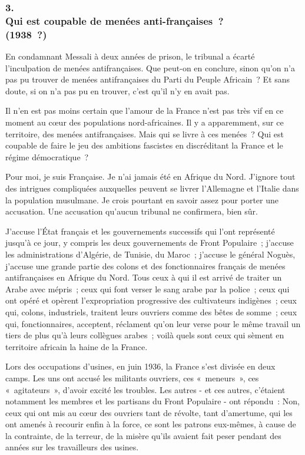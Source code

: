 \documentclass[french,twoside]{book} %
\begin{document}
\subsubsection[{3. Qui est coupable de menées anti-françaises ? (1938 ?)}]{3. \\
Qui est coupable de menées anti-françaises ? \\
(1938 ?)}
\noindent \par
En condamnant Messali à deux années de prison, le tribunal a écarté l'inculpation de menées antifrançaises. Que peut-on en conclure, sinon qu'on n'a pas pu trouver de menées antifrançaises du Parti du Peuple Africain ? Et sans doute, si on n'a pas pu en trouver, c'est qu'il n'y en avait pas.\par
Il n'en est pas moins certain que l'amour de la France n'est pas très vif en ce moment au cœur des populations nord-africaines. Il y a apparemment, sur ce territoire, des menées antifrançaises. Mais qui se livre à ces menées ? Qui est coupable de faire le jeu des ambitions fascistes en discréditant la France et le régime démocratique ?\par
Pour moi, je suis Française. Je n'ai jamais été en Afrique du Nord. J'ignore tout des intrigues compliquées auxquelles peuvent se livrer l'Allemagne et l'Italie dans la population musulmane. Je crois pourtant en savoir assez pour porter une accusation. Une accusation qu'aucun tribunal ne confirmera, bien sûr.\par
J'accuse l'État français et les gouvernements successifs qui l'ont représenté jusqu'à ce jour, y compris les deux gouvernements de Front Populaire ; j'accuse les administrations d'Algérie, de Tunisie, du Maroc ; j'accuse le général Noguès, j'accuse une grande partie des colons et des fonctionnaires français de menées antifrançaises en Afrique du Nord. Tous ceux à qui il est arrivé de traiter un Arabe avec mépris ; ceux qui font verser le sang arabe par la police ; ceux qui ont opéré et opèrent l'expropriation progressive des cultivateurs indigènes ; ceux qui, colons, industriels, traitent leurs ouvriers comme des bêtes de somme ; ceux qui, fonctionnaires, acceptent, réclament qu'on leur verse pour le même travail un tiers de plus qu'à leurs collègues arabes ; voilà quels sont ceux qui sèment en territoire africain la haine de la France.\par
Lors des occupations d'usines, en juin 1936, la France s'est divisée en deux camps. Les uns ont accusé les militants ouvriers, ces « meneurs », ces « agitateurs », d'avoir excité les troubles. Les autres - et ces autres, c'étaient notamment les membres et les partisans du Front Populaire - ont répondu : Non, ceux qui ont mis au cœur des ouvriers tant de révolte, tant d'amertume, qui les ont amenés à recourir enfin à la force, ce sont les patrons eux-mêmes, à cause de la contrainte, de la terreur, de la misère qu'ils avaient fait peser pendant des années sur les travailleurs des usines.\par
\end{document}

